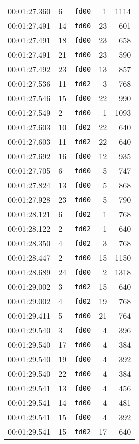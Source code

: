 \documentclass{article}
\begin{document}
\begin{longtable}{lllrr}
00:01:27.360 & 6 & \texttt{fd00} & 1 & 1114 \\
00:01:27.491 & 14 & \texttt{fd00} & 23 & 601 \\
00:01:27.491 & 18 & \texttt{fd00} & 23 & 658 \\
00:01:27.491 & 21 & \texttt{fd00} & 23 & 590 \\
00:01:27.492 & 23 & \texttt{fd00} & 13 & 857 \\
00:01:27.536 & 11 & \texttt{fd02} & 3 & 768 \\
00:01:27.546 & 15 & \texttt{fd00} & 22 & 990 \\
00:01:27.549 & 2 & \texttt{fd00} & 1 & 1093 \\
00:01:27.603 & 10 & \texttt{fd02} & 22 & 640 \\
00:01:27.603 & 11 & \texttt{fd02} & 22 & 640 \\
00:01:27.692 & 16 & \texttt{fd00} & 12 & 935 \\
00:01:27.705 & 6 & \texttt{fd00} & 5 & 747 \\
00:01:27.824 & 13 & \texttt{fd00} & 5 & 868 \\
00:01:27.928 & 23 & \texttt{fd00} & 5 & 790 \\
00:01:28.121 & 6 & \texttt{fd02} & 1 & 768 \\
00:01:28.122 & 2 & \texttt{fd02} & 1 & 640 \\
00:01:28.350 & 4 & \texttt{fd02} & 3 & 768 \\
00:01:28.447 & 2 & \texttt{fd00} & 15 & 1150 \\
00:01:28.689 & 24 & \texttt{fd00} & 2 & 1318 \\
00:01:29.002 & 3 & \texttt{fd02} & 15 & 640 \\
00:01:29.002 & 4 & \texttt{fd02} & 19 & 768 \\
00:01:29.411 & 5 & \texttt{fd00} & 21 & 764 \\
00:01:29.540 & 3 & \texttt{fd00} & 4 & 396 \\
00:01:29.540 & 17 & \texttt{fd00} & 4 & 384 \\
00:01:29.540 & 19 & \texttt{fd00} & 4 & 392 \\
00:01:29.540 & 22 & \texttt{fd00} & 4 & 384 \\
00:01:29.541 & 13 & \texttt{fd00} & 4 & 456 \\
00:01:29.541 & 14 & \texttt{fd00} & 4 & 481 \\
00:01:29.541 & 15 & \texttt{fd00} & 4 & 392 \\
00:01:29.541 & 15 & \texttt{fd02} & 17 & 640 \\

\end{longtable}
\end{document}
